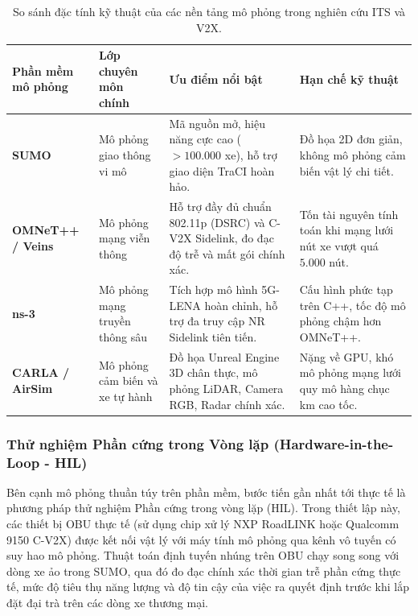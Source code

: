 \documentclass[a4paper]{article}
\begin{document}
\begin{table}[H]
    \centering
    \small
    \begin{tabularx}{\textwidth}{|>{\raggedright\arraybackslash}p{2.4cm}|>{\raggedright\arraybackslash}p{2.8cm}|>{\raggedright\arraybackslash}X|>{\raggedright\arraybackslash}p{3.2cm}|}
        \hline
        \textbf{Phần mềm mô phỏng} & \textbf{Lớp chuyên môn chính} & \textbf{Ưu điểm nổi bật} & \textbf{Hạn chế kỹ thuật} \\
        \hline
        \textbf{SUMO} & Mô phỏng giao thông vi mô & Mã nguồn mở, hiệu năng cực cao ($> 100.000$ xe), hỗ trợ giao diện TraCI hoàn hảo. & Đồ họa 2D đơn giản, không mô phỏng cảm biến vật lý chi tiết. \\
        \hline
        \textbf{OMNeT++ / Veins} & Mô phỏng mạng viễn thông & Hỗ trợ đầy đủ chuẩn 802.11p (DSRC) và C-V2X Sidelink, đo đạc độ trễ và mất gói chính xác. & Tốn tài nguyên tính toán khi mạng lưới nút xe vượt quá $5.000$ nút. \\
        \hline
        \textbf{ns-3} & Mô phỏng mạng truyền thông sâu & Tích hợp mô hình 5G-LENA hoàn chỉnh, hỗ trợ đa truy cập NR Sidelink tiên tiến. & Cấu hình phức tạp trên C++, tốc độ mô phỏng chậm hơn OMNeT++. \\
        \hline
        \textbf{CARLA / AirSim} & Mô phỏng cảm biến và xe tự hành & Đồ họa Unreal Engine 3D chân thực, mô phỏng LiDAR, Camera RGB, Radar chính xác. & Nặng về GPU, khó mô phỏng mạng lưới quy mô hàng chục km cao tốc. \\
        \hline
    \end{tabularx}
    \caption{So sánh đặc tính kỹ thuật của các nền tảng mô phỏng trong nghiên cứu ITS và V2X.}
    \label{tab:simulation_tools}
\end{table}

\subsubsection{Thử nghiệm Phần cứng trong Vòng lặp (Hardware-in-the-Loop - HIL)}
Bên cạnh mô phỏng thuần túy trên phần mềm, bước tiến gần nhất tới thực tế là phương pháp thử nghiệm Phần cứng trong vòng lặp (HIL). Trong thiết lập này, các thiết bị OBU thực tế (sử dụng chip xử lý NXP RoadLINK hoặc Qualcomm 9150 C-V2X) được kết nối vật lý với máy tính mô phỏng qua kênh vô tuyến có suy hao mô phỏng. Thuật toán định tuyến nhúng trên OBU chạy song song với dòng xe ảo trong SUMO, qua đó đo đạc chính xác thời gian trễ phần cứng thực tế, mức độ tiêu thụ năng lượng và độ tin cậy của việc ra quyết định trước khi lắp đặt đại trà trên các dòng xe thương mại.
\end{document}
